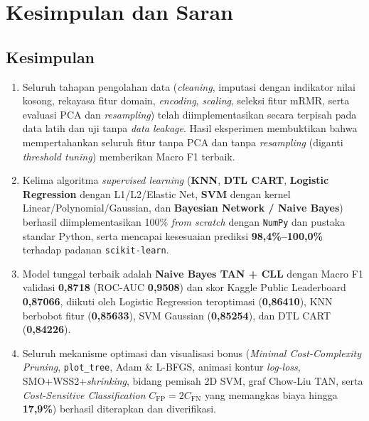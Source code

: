 \documentclass[11pt,a4paper]{article}
\numberwithin{figure}{section}
\numberwithin{table}{section}
\begin{document}
\clearpage
\section{Kesimpulan dan Saran}

\subsection{Kesimpulan}

\begin{enumerate}[leftmargin=1.4cm, itemsep=3pt]
  \item Seluruh tahapan pengolahan data (\textit{cleaning}, imputasi dengan indikator nilai kosong, rekayasa fitur domain, \textit{encoding}, \textit{scaling}, seleksi fitur mRMR, serta evaluasi PCA dan \textit{resampling}) telah diimplementasikan secara terpisah pada data latih dan uji tanpa \textit{data leakage}. Hasil eksperimen membuktikan bahwa mempertahankan seluruh fitur tanpa PCA dan tanpa \textit{resampling} (diganti \textit{threshold tuning}) memberikan Macro F1 terbaik.
  \item Kelima algoritma \textit{supervised learning} (\textbf{KNN}, \textbf{DTL CART}, \textbf{Logistic Regression} dengan L1/L2/Elastic Net, \textbf{SVM} dengan kernel Linear/Polynomial/Gaussian, dan \textbf{Bayesian Network / Naive Bayes}) berhasil diimplementasikan 100\% \textit{from scratch} dengan \texttt{NumPy} dan pustaka standar Python, serta mencapai kesesuaian prediksi \textbf{98,4\%--100,0\%} terhadap padanan \texttt{scikit-learn}.
  \item Model tunggal terbaik adalah \textbf{Naive Bayes TAN + CLL} dengan Macro F1 validasi \textbf{0,8718} (ROC-AUC \textbf{0,9508}) dan skor Kaggle Public Leaderboard \textbf{0,87066}, diikuti oleh Logistic Regression teroptimasi (\textbf{0,86410}), KNN berbobot fitur (\textbf{0,85633}), SVM Gaussian (\textbf{0,85254}), dan DTL CART (\textbf{0,84226}).
  \item Seluruh mekanisme optimasi dan visualisasi bonus (\textit{Minimal Cost-Complexity Pruning}, \texttt{plot\_tree}, Adam \& L-BFGS, animasi kontur \textit{log-loss}, SMO+WSS2+\textit{shrinking}, bidang pemisah 2D SVM, graf Chow-Liu TAN, serta \textit{Cost-Sensitive Classification} $C_{\text{FP}}=2C_{\text{FN}}$ yang memangkas biaya hingga \textbf{17,9\%}) berhasil diterapkan dan diverifikasi.
\end{enumerate}
\end{document}
